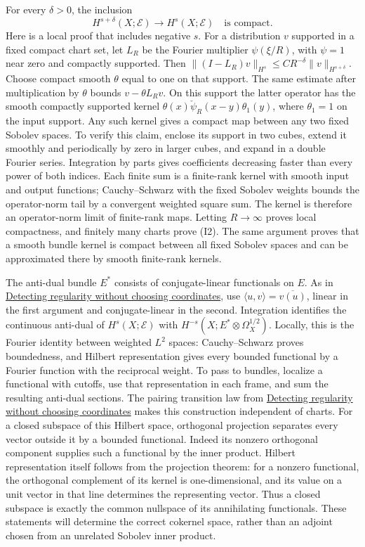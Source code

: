 \documentclass[
  11pt,
]{article}
\begin{document}
For every \(\delta>0\), the inclusion \[
H^{s+\delta}(X;\mathcal E)\longrightarrow H^s(X;\mathcal E)
\quad\text{is compact.}
\tag{I2}
\] Here is a local proof that includes negative \(s\). For a
distribution \(v\) supported in a fixed compact chart set, let \(L_R\)
be the Fourier multiplier \(\psi(\xi/R)\), with \(\psi=1\) near zero and
compactly supported. Then
\(\|(I-L_R)v\|_{H^s}\leq C R^{-\delta}\|v\|_{H^{s+\delta}}\). Choose
compact smooth \(\theta\) equal to one on that support. The same
estimate after multiplication by \(\theta\) bounds \(v-\theta L_Rv\). On
this support the latter operator has the smooth compactly supported
kernel \(\theta(x)\check\psi_R(x-y)\theta_1(y)\), where \(\theta_1=1\)
on the input support. Any such kernel gives a compact map between any
two fixed Sobolev spaces. To verify this claim, enclose its support in
two cubes, extend it smoothly and periodically by zero in larger cubes,
and expand in a double Fourier series. Integration by parts gives
coefficients decreasing faster than every power of both indices. Each
finite sum is a finite-rank kernel with smooth input and output
functions; Cauchy--Schwarz with the fixed Sobolev weights bounds the
operator-norm tail by a convergent weighted square sum. The kernel is
therefore an operator-norm limit of finite-rank maps. Letting
\(R\to\infty\) proves local compactness, and finitely many charts prove
(I2). The same argument proves that a smooth bundle kernel is compact
between all fixed Sobolev spaces and can be approximated there by smooth
finite-rank kernels.

The anti-dual bundle \(E^*\) consists of conjugate-linear functionals on
\(E\). As in \href{geometric-microlocal-calculus.pdf}{Detecting
regularity without choosing coordinates}, use
\(\langle u,v\rangle=\overline{v(u)}\), linear in the first argument and
conjugate-linear in the second. Integration identifies the continuous
anti-dual of \(H^s(X;\mathcal E)\) with
\(H^{-s}(X;E^*\otimes\Omega_X^{1/2})\). Locally, this is the Fourier
identity between weighted \(L^2\) spaces: Cauchy--Schwarz proves
boundedness, and Hilbert representation gives every bounded functional
by a Fourier function with the reciprocal weight. To pass to bundles,
localize a functional with cutoffs, use that representation in each
frame, and sum the resulting anti-dual sections. The pairing transition
law from \href{geometric-microlocal-calculus.pdf}{Detecting regularity
without choosing coordinates} makes this construction independent of
charts. For a closed subspace of this Hilbert space, orthogonal
projection separates every vector outside it by a bounded functional.
Indeed its nonzero orthogonal component supplies such a functional by
the inner product. Hilbert representation itself follows from the
projection theorem: for a nonzero functional, the orthogonal complement
of its kernel is one-dimensional, and its value on a unit vector in that
line determines the representing vector. Thus a closed subspace is
exactly the common nullspace of its annihilating functionals. These
statements will determine the correct cokernel space, rather than an
adjoint chosen from an unrelated Sobolev inner product.
\end{document}
